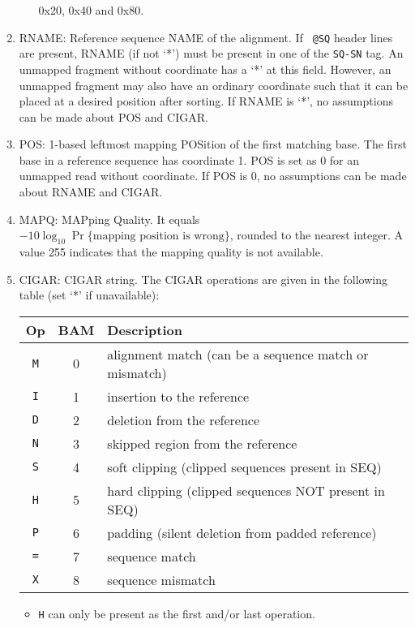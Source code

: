 \documentclass[10pt]{article}
\begin{document}
\begin{enumerate}
\begin{itemize}
    0x20, 0x40 and 0x80.
  \end{itemize}
\item {\sf RNAME}: Reference sequence NAME of the alignment. If {\tt
    @SQ} header lines are present, {\sf RNAME} (if not `*') must be
  present in one of the {\tt SQ-SN} tag. An unmapped fragment without
  coordinate has a `*' at this field. However, an unmapped fragment may
  also have an ordinary coordinate such that it can be placed at a
  desired position after sorting. If {\sf RNAME} is `*', no assumptions
  can be made about {\sf POS} and {\sf CIGAR}.
\item {\sf POS}: 1-based leftmost mapping POSition of the first matching
  base. The first base in a reference sequence has coordinate 1. {\sf
    POS} is set as 0 for an unmapped read without coordinate. If {\sf
    POS} is 0, no assumptions can be made about {\sf RNAME} and {\sf
    CIGAR}.
\item {\sf MAPQ}: MAPping Quality. It equals
  $-10\log_{10}\Pr\{\mbox{mapping position is wrong}\}$, rounded to the
  nearest integer. A value 255 indicates that the mapping quality is not
  available.
\item {\sf CIGAR}: CIGAR string. The CIGAR operations are given in the
  following table (set `*' if unavailable):
  \begin{center}\small
  \begin{tabular}{ccl}
  \hline
  Op & BAM & Description\\
  \hline
  {\tt M} & 0 & alignment match (can be a sequence match or mismatch)\\
  {\tt I} & 1 & insertion to the reference \\
  {\tt D} & 2 & deletion from the reference \\
  {\tt N} & 3 & skipped region from the reference \\
  {\tt S} & 4 & soft clipping (clipped sequences present in {\sf SEQ})\\
  {\tt H} & 5 & hard clipping (clipped sequences NOT present in {\sf SEQ})\\
  {\tt P} & 6 & padding (silent deletion from padded reference)\\
  {\tt =} & 7 & sequence match \\
  {\tt X} & 8 & sequence mismatch \\
  \hline
  \end{tabular}
  \end{center}
  \begin{itemize}
  \item {\tt H} can only be present as the first and/or last operation.

\end{itemize}
\end{enumerate}
\end{document}
